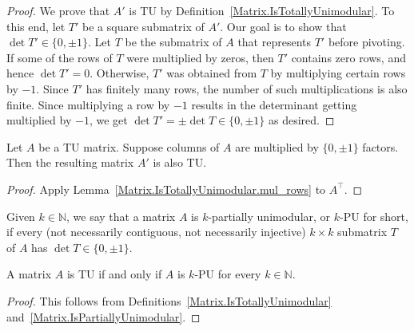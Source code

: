 \begin{proof}
    \leanok
    We prove that $A'$ is TU by Definition~\ref{Matrix.IsTotallyUnimodular}. To this end, let $T'$ be a square submatrix of $A'$. Our goal is to show that $\det T' \in \{0, \pm 1\}$. Let $T$ be the submatrix of $A$ that represents $T'$ before pivoting. If some of the rows of $T$ were multiplied by zeros, then $T'$ contains zero rows, and hence $\det T' = 0$. Otherwise, $T'$ was obtained from $T$ by multiplying certain rows by $-1$. Since $T'$ has finitely many rows, the number of such multiplications is also finite. Since multiplying a row by $-1$ results in the determinant getting multiplied by $-1$, we get $\det T' = \pm \det T \in \{0, \pm 1\}$ as desired.
\end{proof}

\begin{lemma}
    \label{Matrix.IsTotallyUnimodular.mul_cols}
    \leanok
    Let $A$ be a TU matrix. Suppose columns of $A$ are multiplied by $\{0, \pm 1\}$ factors. Then the resulting matrix $A'$ is also TU.
\end{lemma}

\begin{proof}
    \leanok
    Apply Lemma~\ref{Matrix.IsTotallyUnimodular.mul_rows} to $A^{\top}$.
\end{proof}

\begin{definition}
    \label{Matrix.IsPartiallyUnimodular}
    \leanok
    Given $k \in \mathbb{N}$, we say that a matrix $A$ is $k$-partially unimodular, or $k$-PU for short, if every (not necessarily contiguous, not necessarily injective) $k \times k$ submatrix $T$ of $A$ has $\det T \in \{0, \pm 1\}$.
\end{definition}

\begin{lemma}
    \label{Matrix.isTotallyUnimodular_iff_forall_isPartiallyUnimodular}
    \leanok
    A matrix $A$ is TU if and only if $A$ is $k$-PU for every $k \in \mathbb{N}$.
\end{lemma}

\begin{proof}
    \leanok
    This follows from Definitions~\ref{Matrix.IsTotallyUnimodular} and~\ref{Matrix.IsPartiallyUnimodular}.
\end{proof}

